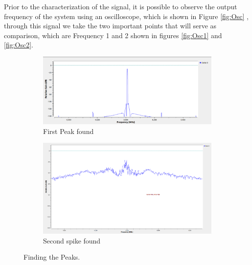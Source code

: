 \documentclass[12pt, twoside]{report}
\begin{document}
Prior to the characterization of the signal, it is possible to observe the output frequency of the system using an oscilloscope, which is shown in Figure \ref{fig:Osc} , through this signal we take the two important points that will serve as comparison, which are Frequency 1 and 2 shown in figures \ref{fig:Osc1} and \ref{fig:Osc2}.
\begin{figure}
     \centering
     \begin{subfigure}[b]{0.8\textwidth}
         \centering
         \includegraphics[width=\textwidth]{images/peak1a.png}
         \caption{First Peak found}
         \label{fig:Peak1}
     \end{subfigure}
     \hfill
     \begin{subfigure}[b]{0.8\textwidth}
         \centering
         \includegraphics[width=\textwidth]{images/peak1.png}
         \caption{Second spike found}
         \label{fig:Peak2}
     \end{subfigure}
     \hfill
        \caption{Finding the Peaks.}
        \label{fig:Peaks}
\end{figure}
\end{document}
